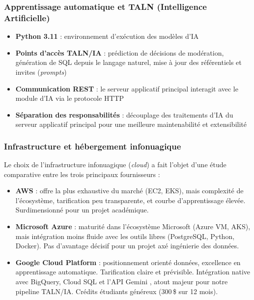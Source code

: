 \documentclass[10pt,twocolumn,a4paper]{article}
\begin{document}
\subsubsection{Apprentissage automatique et TALN (Intelligence Artificielle)}

\begin{itemize}
    \item \textbf{Python 3.11} : environnement d'exécution des modèles d'IA
    \item \textbf{Points d'accès TALN/IA} : prédiction de décisions de modération, génération de SQL depuis le langage naturel, mise à jour des référentiels et invites (\textit{prompts})
    \item \textbf{Communication REST} : le serveur applicatif principal interagit avec le module d'IA via le protocole HTTP
    \item \textbf{Séparation des responsabilités} : découplage des traitements d'IA du serveur applicatif principal pour une meilleure maintenabilité et extensibilité
\end{itemize}

\subsubsection{Infrastructure et hébergement infonuagique}

Le choix de l'infrastructure infonuagique (\textit{cloud}) a fait l'objet d'une étude comparative entre les trois principaux fournisseurs :

\begin{itemize}
    \item \textbf{AWS} \cite{aws} : offre la plus exhaustive du marché (EC2, EKS), mais complexité de l'écosystème, tarification peu transparente, et courbe d'apprentissage élevée. Surdimensionné pour un projet académique.
    \item \textbf{Microsoft Azure} \cite{azure} : maturité dans l'écosystème Microsoft (Azure VM, AKS), mais intégration moins fluide avec les outils libres (PostgreSQL, Python, Docker). Pas d'avantage décisif pour un projet axé ingénierie des données.
    \item \textbf{Google Cloud Platform} \cite{gcp} : positionnement orienté données, excellence en apprentissage automatique. Tarification claire et prévisible. Intégration native avec BigQuery, Cloud SQL et l'API Gemini \cite{gemini}, atout majeur pour notre pipeline TALN/IA. Crédits étudiants généreux (300\,\$ sur 12 mois).
\end{itemize}
\end{document}
